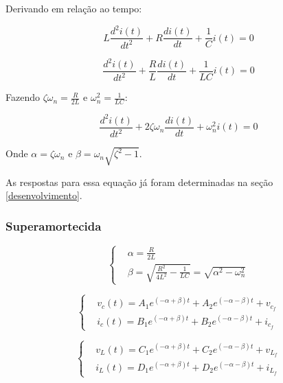 \documentclass[12pt,fleqn]{book} %
\begin{document}
{Derivando em relação ao tempo:

\begin{equation}
L\frac{d^2i(t)}{dt^2} + R\frac{di(t)}{dt} + \frac{1}{C}i(t) = 0
\end{equation}

\begin{equation}
\frac{d^2i(t)}{dt^2} + \frac{R}{L}\frac{di(t)}{dt} + \frac{1}{LC}i(t) = 0
\end{equation}

Fazendo $\zeta\omega_n = \frac{R}{2L}$ e $\omega_n^2 = \frac{1}{LC}$:

\begin{equation}
\frac{d^2i(t)}{dt^2} + 2\zeta\omega_n\frac{di(t)}{dt} + \omega_n^2i(t) = 0
\end{equation}

Onde $\alpha = \zeta\omega_n$ e $\beta = \omega_n\sqrt{\zeta^2-1}$.

As respostas para essa equação já foram determinadas na seção \ref{desenvolvimento}.


            \subsubsection{Superamortecida}
            
            \begin{equation}
\left\{\begin{aligned} & 
        \alpha = \frac{R}{2L}\\&         
        \beta = \sqrt{\frac{R^2}{4L^2}-\frac{1}{LC}} = \sqrt{\alpha^2-\omega_n^2}
    \end{aligned}\right.
\end{equation}

\begin{equation}
\left\{\begin{aligned} & 
        v_c(t) = A_1e^{(-\alpha + \beta)t} + A_2e^{(-\alpha - \beta)t} + v_{c_f}\\&       
        i_c(t) = B_1e^{(-\alpha + \beta)t} + B_2e^{(-\alpha - \beta)t} + i_{c_f}
    \end{aligned}\right.
\end{equation}

\begin{equation}
\left\{\begin{aligned} & 
        v_L(t) = C_1e^{(-\alpha + \beta)t} + C_2e^{(-\alpha - \beta)t} + v_{L_f}\\&       
        i_L(t) = D_1e^{(-\alpha + \beta)t} + D_2e^{(-\alpha - \beta)t} + i_{L_f}
    \end{aligned}\right.
\end{equation}

}
\end{document}
